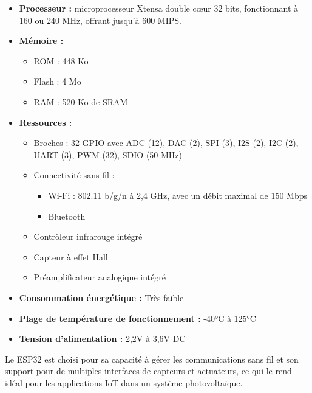 \begin{itemize}
	\item \textbf{Processeur :} microprocesseur Xtensa double cœur 32 bits, fonctionnant à 160 ou 240 MHz, offrant jusqu'à 600 MIPS.
	\item \textbf{Mémoire :}
	\begin{itemize}
		\item ROM : 448 Ko
		\item Flash : 4 Mo
		\item RAM : 520 Ko de SRAM
	\end{itemize}
	\item \textbf{Ressources :}
	\begin{itemize}
		\item Broches : 32 GPIO avec ADC (12), DAC (2), SPI (3), I2S (2), I2C (2), UART (3), PWM (32), SDIO (50 MHz)
		\item Connectivité sans fil :
		\begin{itemize}
			\item Wi-Fi : 802.11 b/g/n à 2,4 GHz, avec un débit maximal de 150 Mbps
			\item Bluetooth
		\end{itemize}
		\item Contrôleur infrarouge intégré
		\item Capteur à effet Hall
		\item Préamplificateur analogique intégré
	\end{itemize}
	\item \textbf{Consommation énergétique :} Très faible
	\item \textbf{Plage de température de fonctionnement :} -40°C à 125°C
	\item \textbf{Tension d'alimentation :} 2,2V à 3,6V DC
\end{itemize}


Le ESP32 est choisi pour sa capacité à gérer les communications sans fil et son support pour de multiples interfaces de capteurs et actuateurs, ce qui le rend idéal pour les applications IoT dans un système photovoltaïque.

